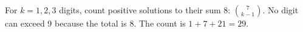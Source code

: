 For $k=1,2,3$ digits, count positive solutions to their sum 8: $\binom7{k-1}$. No digit can exceed 9 because the total is 8. The count is $1+7+21=\boxed{29}$.
